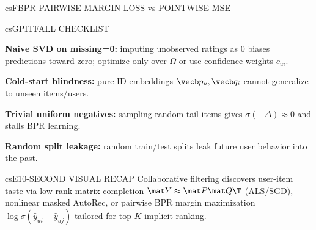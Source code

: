 \documentclass[../../../../master.tex]{subfiles}
\begin{document}
\begin{cscolumns}
\begin{cscard}{csF}{BPR PAIRWISE MARGIN LOSS vs POINTWISE MSE}
  \centering
\end{cscard}
\columnbreak

\begin{cscard}{csG}{PITFALL CHECKLIST}
  \begin{csbul}
    \item \textbf{Naive SVD on missing=0:} imputing unobserved ratings as $0$ biases predictions toward zero; optimize only over $\Omega$ or use confidence weights $c_{ui}$.
    \item \textbf{Cold-start blindness:} pure ID embeddings $\vecb p_u, \vecb q_i$ cannot generalize to unseen items/users.
    \item \textbf{Trivial uniform negatives:} sampling random tail items gives $\sigma(-\Delta)\approx 0$ and stalls BPR learning.
    \item \textbf{Random split leakage:} random train/test splits leak future user behavior into the past.
  \end{csbul}
\end{cscard}

\begin{cscard}{csE}{10-SECOND VISUAL RECAP}
  \sffamily\footnotesize
  Collaborative filtering discovers user-item taste via low-rank matrix completion $\mat Y \approx \mat P\mat Q\T$ (ALS/SGD), nonlinear masked AutoRec, or pairwise BPR margin maximization $\log\sigma(\hat y_{ui}-\hat y_{uj})$ tailored for top-$K$ implicit ranking.
\end{cscard}
\end{cscolumns}

\csend
\end{document}
